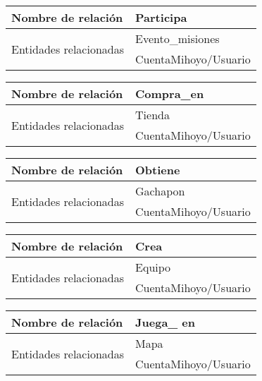 \documentclass{report}
\begin{document}
\begin{center}    
    \begin{tabular}{|p{3cm}|p{5cm}|}
    \hline
    Nombre de relación& Participa\\ 
    \hline
    \hline
    \multirow{2}{6em}{Entidades relacionadas}&Evento\_misiones \\ &CuentaMihoyo/Usuario\\ 
    \hline
    \end{tabular}
\end{center}

\hfill

\begin{center}    
    \begin{tabular}{|p{3cm}|p{5cm}|}
    \hline
    Nombre de relación& Compra\_en\\ 
    \hline
    \hline
    \multirow{2}{6em}{Entidades relacionadas}&Tienda \\ &CuentaMihoyo/Usuario\\ 
    \hline
    \end{tabular}
\end{center}

\hfill

\begin{center}    
    \begin{tabular}{|p{3cm}|p{5cm}|}
    \hline
    Nombre de relación& Obtiene\\ 
    \hline
    \hline
    \multirow{2}{6em}{Entidades relacionadas}& Gachapon \\ &CuentaMihoyo/Usuario\\ 
    \hline
    \end{tabular}
\end{center}

\hfill

\begin{center}    
    \begin{tabular}{|p{3cm}|p{5cm}|}
    \hline
    Nombre de relación& Crea\\ 
    \hline
    \hline
    \multirow{2}{6em}{Entidades relacionadas}&Equipo \\ &CuentaMihoyo/Usuario\\ 
    \hline
    \end{tabular}
\end{center}

\hfill

\begin{center}    
    \begin{tabular}{|p{3cm}|p{5cm}|}
    \hline
    Nombre de relación& Juega\_ en\\ 
    \hline
    \hline
    \multirow{2}{6em}{Entidades relacionadas}& Mapa \\ &CuentaMihoyo/Usuario\\ 
    \hline
    \end{tabular}
\end{center}
\end{document}
